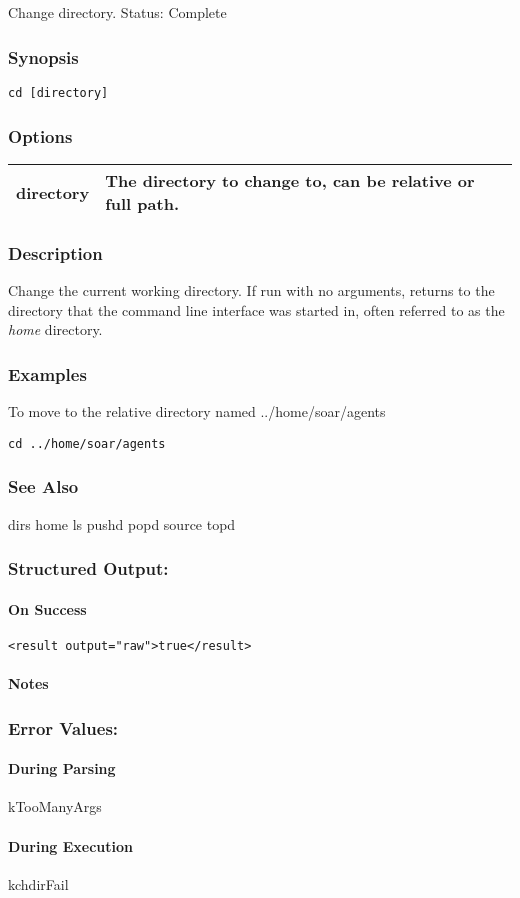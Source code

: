\subsection{}
\label{cd}
Change directory. 
 Status: Complete
\subsubsection*{Synopsis}
\begin{verbatim}
cd [directory]
\end{verbatim}
\subsubsection*{Options}
\begin{tabular}{|l|l|}
\hline 
 directory  & The directory to change to, can be relative or full path.  \\
 \hline 
\end{tabular}
\subsubsection*{Description}
 Change the current working directory. If run with no arguments, returns to the directory that the command line interface was started in, often referred to as the \emph{home}
 directory. 
\subsubsection*{Examples}
 To move to the relative directory named ../home/soar/agents \begin{verbatim}
cd ../home/soar/agents
\end{verbatim}
\subsubsection*{See Also}
 dirs home ls pushd popd source topd
\subsubsection*{Structured Output:}
\paragraph*{On Success}
\begin{verbatim}
<result output="raw">true</result>
\end{verbatim}
\paragraph*{Notes}
\subsubsection*{Error Values:}
\paragraph*{During Parsing}
 kTooManyArgs
\paragraph*{During Execution}
 kchdirFail
